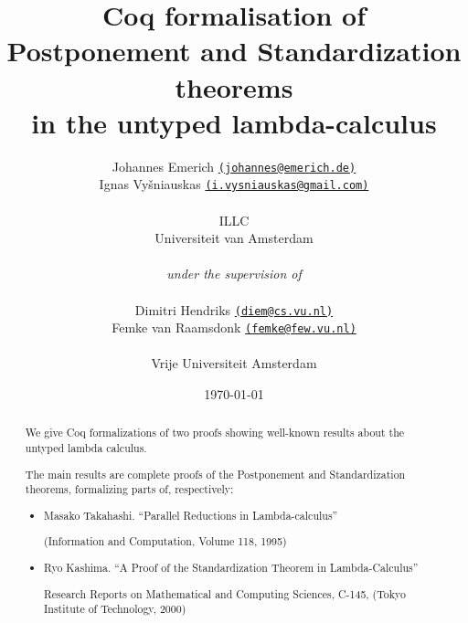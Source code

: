 \documentclass[12pt]{report}
\title{Coq formalisation of \\
    Postponement and Standardization theorems\\
    in the untyped lambda-calculus}
\author{
    Johannes Emerich
        \href{mailto:johannes@emerich.de}{
        \normalsize \texttt{(johannes@emerich.de)}}\\
    Ignas Vyšniauskas
        \href{mailto:i.vysniauskas@gmail.com}{
        \normalsize \texttt{(i.vysniauskas@gmail.com)}}\\
\\
  ILLC \\
  Universiteit van Amsterdam
  \\
  \\
  \emph{under the supervision of}\\
  \\
    Dimitri Hendriks
        \href{mailto:diem@cs.vu.nl}{
        \normalsize \texttt{(diem@cs.vu.nl)}}\\
    Femke van Raamsdonk
        \href{mailto:femke@few.vu.nl}{
        \normalsize \texttt{(femke@few.vu.nl)}}\\
\\
  Vrije Universiteit Amsterdam
}
\date{\today}
\begin{document}
\maketitle
\begin{abstract}
We give Coq formalizations of two proofs showing well-known results
about the untyped lambda calculus.

The main results are complete proofs of the Postponement and
Standardization theorems, formalizing parts of, respectively:
\begin{itemize}
    \item Masako Takahashi. ``Parallel Reductions in Lambda-calculus''

    (Information and Computation, Volume 118, 1995)
    \item Ryo Kashima. ``A Proof of the Standardization Theorem in
        Lambda-Calculus''

      Research Reports on Mathematical and Computing Sciences, C-145, (Tokyo
      Institute of Technology, 2000)
\end{itemize}
\end{abstract}

\tableofcontents








\end{document}
